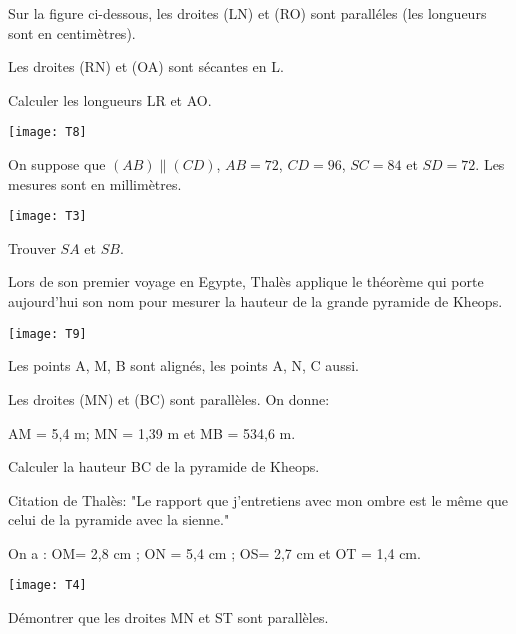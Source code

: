 \newpage


\begin{exercice}
Sur la figure ci-dessous, les droites (LN) et (RO) sont paralléles (les longueurs sont en centimètres).

Les droites (RN) et (OA) sont sécantes en L.

Calculer les longueurs LR et AO.


\begin{center}
\texttt{[image: T8]}
\end{center}
\end{exercice}

\begin{exercice}
On suppose que $(AB)\parallel (CD)$, $AB = 72$, $CD = 96$, $SC = 84$ et $SD = 72$. Les mesures sont en millimètres.

\begin{center}
\texttt{[image: T3]}
\end{center}

Trouver $SA$ et $SB$.
\end{exercice}

\begin{exercice}
Lors de son premier voyage en Egypte, Thalès applique le théorème qui porte aujourd'hui son nom pour mesurer la hauteur de la grande pyramide de Kheops.

\begin{center}
\texttt{[image: T9]}
\end{center}

Les points A, M, B sont alignés, les points A, N, C aussi.

Les droites (MN) et (BC) sont parallèles. On donne:

AM = 5,4 m; MN = 1,39 m et MB = 534,6 m.

Calculer la hauteur BC de la pyramide de Kheops.

Citation de Thalès: "Le rapport que j'entretiens avec mon ombre est le même que celui de la pyramide avec la sienne."
\end{exercice}

\begin{exercice}
On a : OM= 2,8 cm ; ON = 5,4 cm ; OS= 2,7 cm
et OT = 1,4 cm.

\begin{center}
\texttt{[image: T4]}
\end{center}
Démontrer que les droites MN et ST sont parallèles.
\end{exercice}

